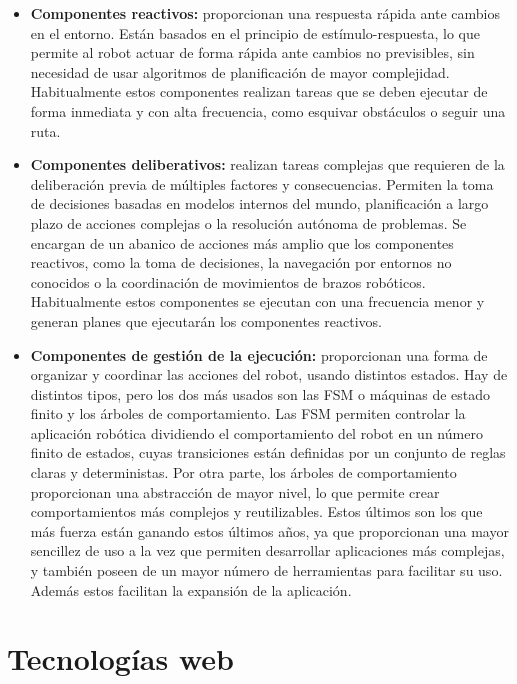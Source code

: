 \begin{itemize}
    \item \textbf{Componentes reactivos:} proporcionan una respuesta rápida ante cambios en el entorno. Están basados en el principio de estímulo-respuesta, lo que permite al robot actuar de forma rápida ante cambios no previsibles, sin necesidad de usar algoritmos de planificación de mayor complejidad. Habitualmente estos componentes realizan tareas que se deben ejecutar de forma inmediata y con alta frecuencia, como esquivar obstáculos o seguir una ruta. 

    \item \textbf{Componentes deliberativos:} realizan tareas complejas que requieren de la deliberación previa de múltiples factores y consecuencias. Permiten la toma de decisiones basadas en modelos internos del mundo, planificación a largo plazo de acciones complejas o la resolución autónoma de problemas. Se encargan de un abanico de acciones más amplio que los componentes reactivos, como la toma de decisiones, la navegación por entornos no conocidos o la coordinación de movimientos de brazos robóticos. Habitualmente estos componentes se ejecutan con una frecuencia menor y generan planes que ejecutarán los componentes reactivos.

    \item \textbf{Componentes de gestión de la ejecución:} proporcionan una forma de organizar y coordinar las acciones del robot, usando distintos estados. Hay de distintos tipos, pero los dos más usados son las FSM o máquinas de estado finito y los árboles de comportamiento. Las FSM permiten controlar la aplicación robótica dividiendo el comportamiento del robot en un número finito de estados, cuyas transiciones están definidas por un conjunto de reglas claras y deterministas. Por otra parte, los árboles de comportamiento proporcionan una abstracción de mayor nivel, lo que permite crear comportamientos más complejos y reutilizables. Estos últimos son los que más fuerza están ganando estos últimos años, ya que proporcionan una mayor sencillez de uso a la vez que permiten desarrollar aplicaciones más complejas, y también poseen de un mayor número de herramientas para facilitar su uso. Además estos facilitan la expansión de la aplicación.

\end{itemize}

\section{Tecnologías web}

